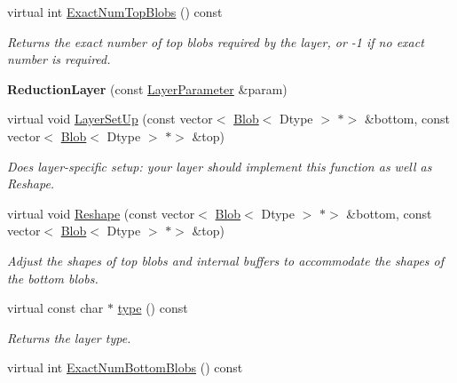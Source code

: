 \begin{DoxyCompactItemize}
virtual int \mbox{\hyperlink{classcaffe_1_1_reduction_layer_a14224774af732030c5f1c8a3d79e1fc3}{Exact\+Num\+Top\+Blobs}} () const
\begin{DoxyCompactList}\small\item\em Returns the exact number of top blobs required by the layer, or -\/1 if no exact number is required. \end{DoxyCompactList}\item 
\mbox{\label{classcaffe_1_1_reduction_layer_aefb1d51cf2b4ce4248d9614267191e4d}} 
{\bfseries Reduction\+Layer} (const \mbox{\hyperlink{classcaffe_1_1_layer_parameter}{Layer\+Parameter}} \&param)
\item 
virtual void \mbox{\hyperlink{classcaffe_1_1_reduction_layer_a5503c3dac40e2a92d8bfca77d0712dfb}{Layer\+Set\+Up}} (const vector$<$ \mbox{\hyperlink{classcaffe_1_1_blob}{Blob}}$<$ Dtype $>$ $\ast$$>$ \&bottom, const vector$<$ \mbox{\hyperlink{classcaffe_1_1_blob}{Blob}}$<$ Dtype $>$ $\ast$$>$ \&top)
\begin{DoxyCompactList}\small\item\em Does layer-\/specific setup\+: your layer should implement this function as well as Reshape. \end{DoxyCompactList}\item 
virtual void \mbox{\hyperlink{classcaffe_1_1_reduction_layer_ad830b3c52fb34555e45cd172a8b27ed9}{Reshape}} (const vector$<$ \mbox{\hyperlink{classcaffe_1_1_blob}{Blob}}$<$ Dtype $>$ $\ast$$>$ \&bottom, const vector$<$ \mbox{\hyperlink{classcaffe_1_1_blob}{Blob}}$<$ Dtype $>$ $\ast$$>$ \&top)
\begin{DoxyCompactList}\small\item\em Adjust the shapes of top blobs and internal buffers to accommodate the shapes of the bottom blobs. \end{DoxyCompactList}\item 
\mbox{\label{classcaffe_1_1_reduction_layer_aafc754e45877961380a214e5410033ed}} 
virtual const char $\ast$ \mbox{\hyperlink{classcaffe_1_1_reduction_layer_aafc754e45877961380a214e5410033ed}{type}} () const
\begin{DoxyCompactList}\small\item\em Returns the layer type. \end{DoxyCompactList}\item 
virtual int \mbox{\hyperlink{classcaffe_1_1_reduction_layer_a64694af2e56723590072cac88bf825c7}{Exact\+Num\+Bottom\+Blobs}} () const

\end{DoxyCompactItemize}
